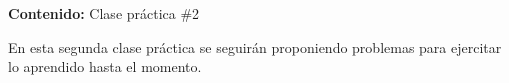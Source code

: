 {\Large
    \textbf{Contenido:} Clase práctica \#2
}

En esta segunda clase práctica se seguirán proponiendo problemas para ejercitar lo aprendido hasta el momento.